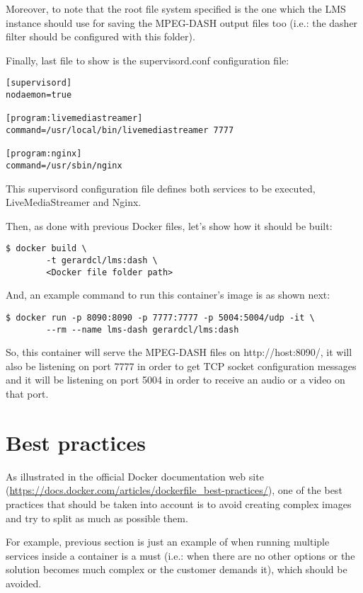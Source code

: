 Moreover, to note that the root file system specified is the one which the LMS instance should use for saving the MPEG-DASH output files too (i.e.: the dasher filter should be configured with this folder).

Finally, last file to show is the supervisord.conf configuration file:

\begin{verbatim}
[supervisord]
nodaemon=true

[program:livemediastreamer]
command=/usr/local/bin/livemediastreamer 7777

[program:nginx]
command=/usr/sbin/nginx 
\end{verbatim}

This supervisord configuration file defines both services to be executed, LiveMediaStreamer and Nginx.  

Then, as done with previous Docker files, let's show how it should be built:

\begin{verbatim}
$ docker build \
		-t gerardcl/lms:dash \
		<Docker file folder path>
\end{verbatim}

And, an example command to run this container's image is as shown next:

\begin{verbatim}
$ docker run -p 8090:8090 -p 7777:7777 -p 5004:5004/udp -it \
		--rm --name lms-dash gerardcl/lms:dash 
\end{verbatim}

So, this container will serve the MPEG-DASH files on http://host:8090/, it will also be listening on port 7777 in order to get TCP socket configuration messages and it will be listening on port 5004 in order to receive an audio or a video on that port.

\section{Best practices}

As illustrated in the official Docker documentation web site (\url{https://docs.docker.com/articles/dockerfile_best-practices/}), one of the best practices that should be taken into account is to avoid creating complex images and try to split as much as possible them.

For example, previous section is just an example of when running multiple services inside a container is a must (i.e.: when there are no other options or the solution becomes much complex or the customer demands it), which should be avoided.

